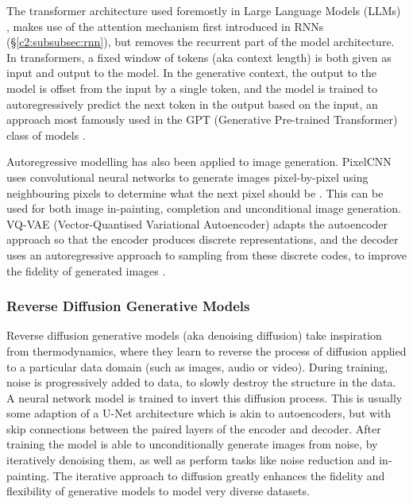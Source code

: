 The transformer architecture used foremostly in Large Language Models (LLMs) \citep{vaswani2017attention}, makes use of the attention mechanism first introduced in RNNs \citep{bahdanau2014neural} (\S \ref{c2:subsubsec:rnn}), but removes the recurrent part of the model architecture.
In transformers, a fixed window of tokens (aka context length) is both given as input and output to the model.
In the generative context, the output to the model is offset from the input by a single token, and the model is trained to autoregressively predict the next token in the output based on the input, an approach most famously used in the GPT (Generative Pre-trained Transformer) class of models \citep{radford2018improving, radford2019language,brown2020language}.

Autoregressive modelling has also been applied to image generation.
PixelCNN uses convolutional neural networks to generate images pixel-by-pixel using neighbouring pixels to determine what the next pixel should be \citep{van2016conditional}.
This can be used for both image in-painting, completion and unconditional image generation.
VQ-VAE (Vector-Quantised Variational Autoencoder) adapts the autoencoder approach so that the encoder produces discrete representations, and the decoder uses an autoregressive approach to sampling from these discrete codes, to improve the fidelity of generated images \citep{van2017neural}. 

\subsubsection{Reverse Diffusion Generative Models}
\label{c2:subsubsec:diffusion}

Reverse diffusion generative models (aka denoising diffusion) take inspiration from thermodynamics, where they learn to reverse the process of diffusion applied to a particular data domain \citep{sohl2015deep} (such as images, audio or video). 
During training, noise is progressively added to data, to slowly destroy the structure in the data.
A neural network model is trained to invert this diffusion process. This is usually some adaption of a U-Net architecture \citep{ronneberger2015u} which is akin to autoencoders, but with skip connections between the paired layers of the encoder and decoder.
After training the model is able to unconditionally generate images from noise, by iteratively denoising them, as well as perform tasks like noise reduction and in-painting. 
The iterative approach to diffusion greatly enhances the fidelity and flexibility of generative models to model very diverse datasets.

